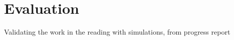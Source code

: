 \chapter{Evaluation} \label{Chapter:six}
Validating the work in the reading with simulations, from progress report